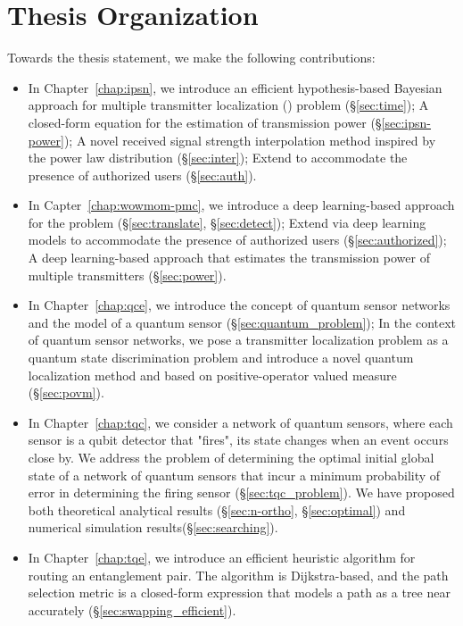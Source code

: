 \section{Thesis Organization}

Towards the thesis statement, we make the following contributions:

\begin{itemize}
    \item In Chapter~\ref{chap:ipsn}, we introduce an efficient hypothesis-based Bayesian approach \ouralgo for multiple transmitter localization (\mtl) problem (\S\ref{sec:time}); 
          A closed-form equation for the estimation of transmission power (\S\ref{sec:ipsn-power});
          A novel received signal strength interpolation method inspired by the power law distribution (\S\ref{sec:inter});
          Extend \ouralgo to accommodate the presence of authorized users (\S\ref{sec:auth}).
    
    \item In Capter~\ref{chap:wowmom-pmc}, we introduce a deep learning-based approach \our for the \mtl problem (\S\ref{sec:translate}, \S\ref{sec:detect});
          Extend \our via deep learning models to accommodate the presence of authorized users (\S\ref{sec:authorized});
          A deep learning-based approach that estimates the transmission power of multiple transmitters (\S\ref{sec:power}).
    
    \item In Chapter~\ref{chap:qce}, we introduce the concept of quantum sensor networks and the model of a quantum sensor (\S\ref{sec:quantum_problem});
          In the context of quantum sensor networks, we pose a transmitter localization problem as a quantum state discrimination problem 
          and introduce a novel quantum localization method \povm and \povmpro based on positive-operator valued measure (\S\ref{sec:povm}).
    
    \item In Chapter~\ref{chap:tqc}, we consider a network of quantum sensors, where each sensor is a qubit detector that "fires", its state changes when an event occurs close by.
          We address the problem of determining the optimal initial global state of a network of quantum sensors that incur a minimum probability of error in determining the firing sensor (\S\ref{sec:tqc_problem}).
          We have proposed both theoretical analytical results (\S\ref{sec:n-ortho}, \S\ref{sec:optimal}) and numerical simulation results(\S\ref{sec:searching}).
          
    \item In Chapter~\ref{chap:tqe}, we introduce an efficient heuristic algorithm \dpalt for routing an entanglement pair.
          The algorithm is Dijkstra-based, and the path selection metric is a closed-form expression that models a path as a tree near accurately (\S\ref{sec:swapping_efficient}).
\end{itemize}


